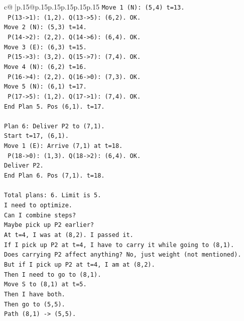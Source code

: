 \documentclass{article}
\begin{document}
{\begin{supertabular}{c@{$\;$}|p{.15\linewidth}@{}p{.15\linewidth}p{.15\linewidth}p{.15\linewidth}p{.15\linewidth}p{.15\linewidth}}
{{{\texttt{Move 1 (N): (5,4) t=13.} \\
\texttt{  P(13{-}>1): (1,2). Q(13{-}>5): (6,2). OK.} \\
\texttt{Move 2 (N): (5,3) t=14.} \\
\texttt{  P(14{-}>2): (2,2). Q(14{-}>6): (6,4). OK.} \\
\texttt{Move 3 (E): (6,3) t=15.} \\
\texttt{  P(15{-}>3): (3,2). Q(15{-}>7): (7,4). OK.} \\
\texttt{Move 4 (N): (6,2) t=16.} \\
\texttt{  P(16{-}>4): (2,2). Q(16{-}>0): (7,3). OK.} \\
\texttt{Move 5 (N): (6,1) t=17.} \\
\texttt{  P(17{-}>5): (1,2). Q(17{-}>1): (7,4). OK.} \\
\texttt{End Plan 5. Pos (6,1). t=17.} \\
\\ 
\texttt{Plan 6: Deliver P2 to (7,1).} \\
\texttt{Start t=17, (6,1).} \\
\texttt{Move 1 (E): Arrive (7,1) at t=18.} \\
\texttt{  P(18{-}>0): (1,3). Q(18{-}>2): (6,4). OK.} \\
\texttt{Deliver P2.} \\
\texttt{End Plan 6. Pos (7,1). t=18.} \\
\\ 
\texttt{Total plans: 6. Limit is 5.} \\
\texttt{I need to optimize.} \\
\texttt{Can I combine steps?} \\
\texttt{Maybe pick up P2 earlier?} \\
\texttt{At t=4, I was at (8,2). I passed it.} \\
\texttt{If I pick up P2 at t=4, I have to carry it while going to (8,1).} \\
\texttt{Does carrying P2 affect anything? No, just weight (not mentioned).} \\
\texttt{But if I pick up P2 at t=4, I am at (8,2).} \\
\texttt{Then I need to go to (8,1).} \\
\texttt{Move S to (8,1) at t=5.} \\
\texttt{Then I have both.} \\
\texttt{Then go to (5,5).} \\
\texttt{Path (8,1) {-}> (5,5).} \\
}}}
\end{supertabular}}
\end{document}
